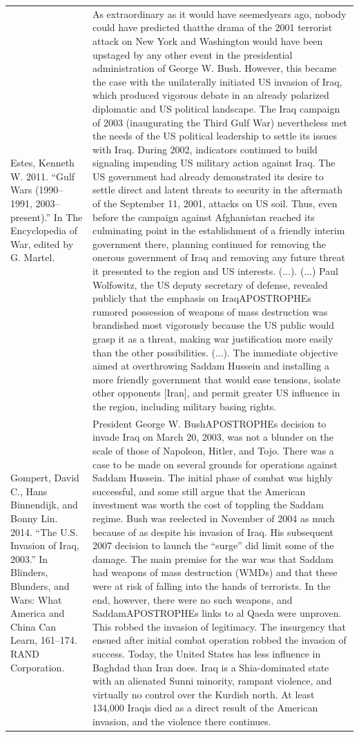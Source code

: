{\begin{longtable}{p{}p{}}
\\
Estes, Kenneth W. 2011. “Gulf Wars (1990–1991, 2003–present).” In The Encyclopedia of War, edited by G. Martel. & As extraordinary as it would have seemedyears ago, nobody could have predicted thatthe drama of the 2001 terrorist attack on New York and Washington would have been upstaged by any other event in the presidential administration of George W. Bush. However, this became the case with the unilaterally initiated US invasion of Iraq, which produced vigorous debate in an already polarized diplomatic and US political landscape. The Iraq campaign of 2003 (inaugurating the Third Gulf War) nevertheless met the needs of the US political leadership to settle its issues with Iraq. During 2002, indicators continued to build signaling impending US military action against Iraq. The US government had already demonstrated its desire to settle direct and latent threats to security in the aftermath of the September 11, 2001, attacks on US soil. Thus, even before the campaign against Afghanistan reached its culminating point in the establishment of a friendly interim government there, planning continued for removing the onerous government of Iraq and removing any future threat it presented to the region and US interests. (...). (...) Paul Wolfowitz, the US deputy secretary of defense, revealed publicly that the emphasis on IraqAPOSTROPHEs rumored possession of weapons of mass destruction was brandished most vigorously because the US public would grasp it as a threat, making war justification more easily than the other possibilities. (...). The immediate objective aimed at overthrowing Saddam Hussein and installing a more friendly government that would ease tensions, isolate other opponents [Iran], and permit greater US influence in the region, including military basing rights.
\\
Gompert, David C., Hans Binnendijk, and Bonny Lin. 2014. “The U.S. Invasion of Iraq, 2003.” In Blinders, Blunders, and Wars: What America and China Can Learn, 161–174. RAND Corporation. & President George W. BushAPOSTROPHEs decision to invade Iraq on March 20, 2003, was not a blunder on the scale of those of Napoleon, Hitler, and Tojo. There was a case to be made on several grounds for operations against Saddam Hussein. The initial phase of combat was highly successful, and some still argue that the American investment was worth the cost of toppling the Saddam regime. Bush was reelected in November of 2004 as much because of as despite his invasion of Iraq. His subsequent 2007 decision to launch the “surge” did limit some of the damage. The main premise for the war was that Saddam had weapons of mass destruction (WMDs) and that these were at risk of falling into the hands of terrorists. In the end, however, there were no such weapons, and SaddamAPOSTROPHEs links to al Qaeda were unproven. This robbed the invasion of legitimacy. The insurgency that ensued after initial combat operation robbed the invasion of success. Today, the United States has less influence in Baghdad than Iran does. Iraq is a Shia-dominated state with an alienated Sunni minority, rampant violence, and virtually no control over the Kurdish north. At least 134,000 Iraqis died as a direct result of the American invasion, and the violence there continues.

\end{longtable}}
